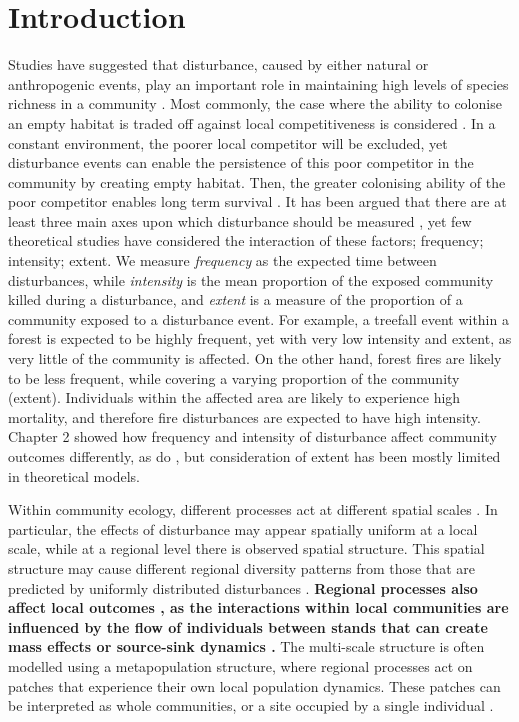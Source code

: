 \section{Introduction}
Studies have suggested that disturbance, caused by either natural or anthropogenic events, play an important role in maintaining high levels of species richness in a community \citep{connell1978diversity,huston1979general,sousa1984role,schoener1974resource}. Most commonly, the case where the ability to colonise an empty habitat is traded off against local competitiveness is considered \citep[e.g.][]{tilman1994competition, cadotte2006testing}. In a constant environment, the poorer local competitor will be excluded, yet disturbance events can enable the persistence of this poor competitor in the community by creating empty habitat. Then, the greater colonising ability of the poor competitor enables long term survival \citep{sousa1984role,denslow1987tropical,connell1978diversity,grime1973competitive,huston1979general}. It has been argued that there are at least three main axes upon which disturbance should be measured \cite{malanson1984intensity,miller1982community,sousa1984role}, yet few theoretical studies have considered the interaction of these factors; frequency; intensity; extent. We measure \emph{frequency} as the expected time between disturbances, while \emph{intensity} is the mean proportion of the exposed community killed during a disturbance, and \emph{extent} is a measure of the proportion of a community exposed to a disturbance event. For example, a treefall event within a forest is expected to be highly frequent, yet with very low intensity and extent, as very little of the community is affected. On the other hand, forest fires are likely to be less frequent, while covering a varying proportion of the community (extent). Individuals within the affected area are likely to experience high mortality, and therefore fire disturbances are expected to have high intensity. Chapter 2 showed how  frequency and intensity of disturbance affect community outcomes differently, as do \cite{miller2011frequency}, but consideration of extent has been mostly limited in theoretical models.

Within community ecology, different processes act at different spatial scales \citep{levin1992problem}. In particular, the effects of disturbance may appear spatially uniform at a local scale, while at a regional level there is observed spatial structure. This spatial structure may cause different regional diversity patterns from those that are predicted by uniformly distributed disturbances \citep{vuilleumier2007patch}. \textbf{Regional processes also affect local outcomes \citep{holt1993ecology}, as the interactions within local communities are influenced by the flow of individuals between stands that can create mass effects \citep{shmida1985biological} or source-sink dynamics \citep{pulliam1988sources}.} The multi-scale structure is often modelled using a metapopulation structure, where regional processes act on patches that experience their own local population dynamics. These patches can be interpreted as whole communities, or a site occupied by a single individual \cite{tilman1994competition,calcagno2006coexistence}.

